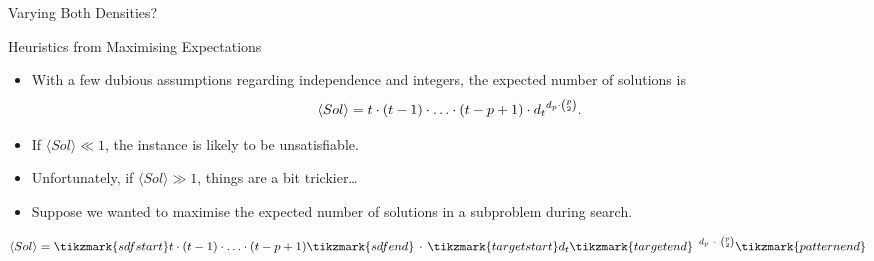 \documentclass{beamer}
\begin{document}
\begin{frame}{Varying Both Densities?}
     {
        
    }

     {
        
    }

     {
        
    }
\end{frame}

\begin{frame}{Heuristics from Maximising Expectations}

     {
        \begin{itemize}
            \item With a few dubious assumptions regarding independence and integers, the expected
                number of solutions is \[ \langle Sol \rangle = t \cdot (t - 1) \cdot \ldots
                        \cdot (t - p + 1) \cdot {d_t}^{d_p \cdot \binom{p}{2}} \textnormal{.} \]
            \item If $\langle Sol \rangle \ll 1$, the instance is likely to be unsatisfiable.
            \item Unfortunately, if $\langle Sol \rangle \gg 1$, things are a bit trickier\ldots
        \end{itemize}
    }

     {
        
    }

     {
        \begin{itemize}
            \item Suppose we wanted to maximise the expected number of solutions in a subproblem during
                search. \\[0.3cm]

        \end{itemize}
        {\Large \[ \langle Sol \rangle = \tikzmark{sdfstart}t \cdot (t - 1) \cdot \ldots \cdot (t -
                p + 1)\tikzmark{sdfend} \, \cdot \,
                {\tikzmark{targetstart}d_t\tikzmark{targetend}
                ~}^{\, d_p ~ \cdot ~ \binom{p}{2}}\tikzmark{patternend}
        \] \\[0.5cm]}

        }
\end{frame}
\end{document}
